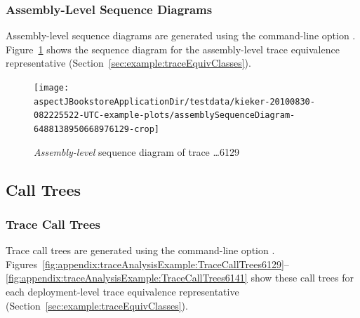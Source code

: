 \pagebreak

\subsubsection{Assembly-Level Sequence Diagrams}\label{sec:example:assemblySeqDiagrams}%

Assembly-level sequence diagrams are generated using the command-line option \OPT{\OPTplotAssemblySequenceDiagrams}. %
Figure~\ref{fig:appendix:traceAnalysisExample:SeqDiagrDepl6129} %
shows the sequence diagram for the assembly-level trace equivalence representative %
(Section~\ref{sec:example:traceEquivClasses}).

\begin{figure}[h]\centering
\texttt{[image: \\aspectJBookstoreApplicationDir/testdata/kieker-20100830-082225522-UTC-example-plots/assemblySequenceDiagram-6488138950668976129-crop]}
\caption{\textit{Assembly-level} sequence diagram of trace \ldots{}6129}
\label{fig:appendix:traceAnalysisExample:SeqDiagrDepl6129}
\end{figure}


\subsection{Call Trees}\label{sec:example:callTrees}%

\subsubsection{Trace Call Trees}\label{sec:example:traceCallTrees}%

\enlargethispage{1.2cm}

Trace call trees are generated using the command-line option \OPT{\OPTplotCallTrees}. %
Figures~\ref{fig:appendix:traceAnalysisExample:TraceCallTrees6129}--\ref{fig:appendix:traceAnalysisExample:TraceCallTrees6141} %
show these call trees for each deployment-level %
trace equivalence representative (Section~\ref{sec:example:traceEquivClasses}).

